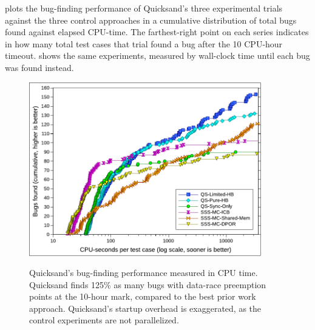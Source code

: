 plots the bug-finding performance of Quicksand's three experimental trials
against the three control approaches
in a cumulative distribution of total bugs found against elapsed CPU-time.
The farthest-right point on each series indicates in how many total test cases that trial found a bug
after the 10 CPU-hour timeout.
 shows
the same experiments, measured by wall-clock time until each bug was found instead.

\begin{figure}[h]
	\begin{center}
        \includegraphics[width=0.9\textwidth]{../proposal/dowefindbugsfaster-v2.pdf} \\
	\end{center}
	\caption[Quicksand's bug-finding performance measured in CPU time.]
		{Quicksand's bug-finding performance measured in CPU time.
		Quicksand finds 125\% as many bugs with data-race preemption points at the 10-hour mark,
		compared to the best prior work approach.
		Quicksand's startup overhead is exaggerated, as the control experiments are not parallelized.}
        \label{fig:dowefindbugsfaster-cpu}
\end{figure}
